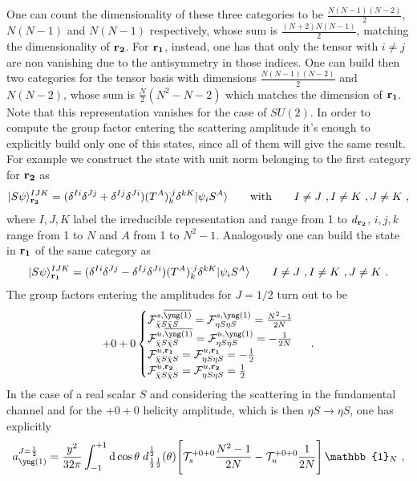 \documentclass[a4paper,11pt]{article}
\newcommand{\be}{\begin{equation}}
\newcommand{\ee}{\end{equation}}
\begin{document}
 One can count the dimensionality of these three categories to be $\frac{N(N-1)(N-2)}{2}$, $N(N-1)$ and $N(N-1)$ respectively, whose sum is $\frac{(N+2)N(N-1)}{2}$, matching the dimensionality of ${\bf r_2}$.  For ${\bf r_1}$, instead, one has that only the tensor with $i\ne j$ are non vanishing due to the antisymmetry in those indices. One can build then two categories for the tensor basis with dimensions $\frac{N(N-1)(N-2)}{2}$ and $N(N-2)$, whose sum is $\frac{N}{2}(N^2-N-2)$ which matches the dimension of ${\bf r_1}$. Note that this representation vanishes for the case of $SU(2)$. In order to compute  the group factor entering the scattering amplitude it's enough to explicitly build only one of this states, since all of them will give the same result. For example we construct the state with unit norm belonging to the first category for ${\bf r_2}$ as
\be\label{eq:r2}
| S \psi \rangle ^{IJK}_{\bf {r_2}} =( \delta^{I i}\delta^{J j}+ \delta^{I j} \delta^{J i} ) (T^A)_k^{\cdot j}\delta^{k K}|  \psi_i S^A\rangle \qquad {\rm with} \qquad I \ne J \ , I\ne K \ , J\ne K \ ,
\ee
where $I,J,K$ label the irreducible representation and range from 1 to $d_{{\bf r_2}}$, $i,j,k$ range from 1 to $N$ and $A$ from 1 to $N^2-1$. Analogously one can build the state in ${\bf r_1}$ of the same category as
\be\label{eq:r1}
| S \psi \rangle ^{IJK}_{\bf {r_1}} =( \delta^{I i}\delta^{J j}- \delta^{I j} \delta^{J i} ) (T^A)_k^{\cdot j}\delta^{k K}|  \psi_i S^A\rangle \qquad I \ne J \ , I\ne K \ , J\ne K \ .
\ee
The group factors entering the amplitudes for $J=1/2$ turn out to be
\begin{align}\label{eq:group_model3_J12}
+0+0
\begin{cases}
{\cal F}^{s,{{\overline{\tiny{\yng(1)}}}}}_{\bar \chi S \bar \chi S} = {\cal F}^{s,{\tiny{\yng(1)}}}_{\eta S \eta S} =\frac{N^2-1}{2N}\\ 
%
{\cal F}^{u,{{\overline{\tiny{\yng(1)}}}}}_{\bar \chi S \bar \chi S} = {\cal F}^{u,{\tiny{\yng(1)}}}_{\eta S \eta S} =-\frac{1}{2N}\\ 
%
{\cal F}^{u,{\bf r_1}}_{\bar \chi S \bar \chi S} = {\cal F}^{u,{\bf r_1}}_{\eta S \eta S} =-\frac{1}{2}\\ 
%
{\cal F}^{u,{\bf r_2}}_{\bar \chi S \bar \chi S} = {\cal F}^{u,{\bf r_2}}_{\eta S \eta S} =\frac{1}{2}\\ 
\end{cases} \ .
\end{align}
In the case of a real scalar $S$ and considering the scattering in the fundamental channel and for the $+0+0$ helicity amplitude, which is then $\eta S\to \eta S$, one has explicitly \begin{align}\label{eq:model3_j12}
a^{J=\frac{1}{2}}_{{\tiny{\yng(1)}}}=
\frac{y^2}{32\pi}
 \int_{-1}^{+1}{\rm d}\cos\theta \;
d^\frac{1}{2}_{\frac{1}{2}\frac{1}{2}}(\theta)\Bigg[   {\cal T}_s^{+0+0} \frac{N^2-1}{2N}-   {\cal T}_u^{+0+0} \frac{1}{2N}\Bigg] \, {\mathbb{1}}_N\ ,
\end{align}
\end{document}
